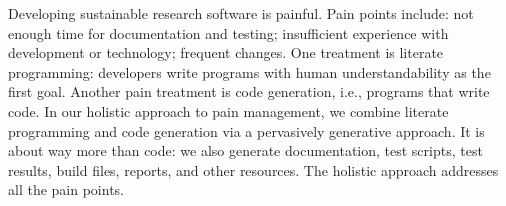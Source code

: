 Developing sustainable research software is painful.  Pain points include: not
enough time for documentation and testing; insufficient experience with
development or technology; frequent changes.  One treatment is literate
programming: developers write programs with human understandability as the first
goal. Another pain treatment is code generation, i.e., programs that write code.
In our holistic approach to pain management, we combine literate programming and
code generation via a pervasively generative approach.  It is about way more
than code: we also generate documentation, test scripts, test results, build
files, reports, and other resources. The holistic approach addresses all the
pain points.